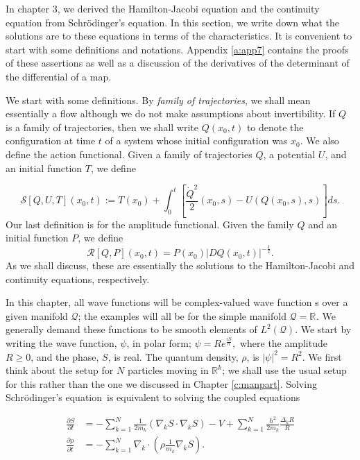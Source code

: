 \documentclass[11pt]{article}
\theoremstyle{remark}
\begin{document}
In chapter 3, we derived the Hamilton-Jacobi equation and the
continuity equation from Schr\"odinger's equation. In this section, we write down what the
solutions are to these equations in terms of the characteristics. 
It is convenient to start with some
definitions and notations. Appendix \ref{a:app7} contains the proofs
of these assertions as well as a discussion of the derivatives of the
determinant of the differential of a map. 

We start with some definitions. 
By \emph{family of trajectories}, we shall mean
essentially a flow although we do not make assumptions about
invertibility. If $Q$ is a family of trajectories, then we shall write
$Q(x_0, t)$  to denote the configuration at time $t$ of a system whose
initial configuration was $x_0$. We also define the action
functional. Given a family of trajectories $Q$, a potential $U$, and 
an initial function $T$, we define 


\[ 
\ensuremath{\mathcal{S}}[Q, U, T] (x_0, t) \ensuremath{:=}   T(x_0) + \int_0^t [
\frac{\dot{Q}^2}{2}(x_0, s) -
U(Q(x_0,s), s)] ds.
\]
Our last definition is for the amplitude functional. Given the family
$Q$ and an initial function $P$, we define 
\[
\ensuremath{\mathcal{R}}[Q, P](x_0, t) = P(x_0) |DQ(x_0,t) |^{-\frac{1}{2}}. 
\]
As we shall discuss, these are essentially the solutions to the
Hamilton-Jacobi and continuity equations, respectively. 

In this chapter, all wave functions will be complex-valued wave function
s over a given manifold \ensuremath{\mathcal{Q}}; the examples will all be for the
simple manifold 
$\ensuremath{\mathcal{Q}} = \ensuremath{\mathbb{R}^{}}$. 
We generally demand these functions to be smooth elements of
$L^2(\ensuremath{\mathcal{Q}})$. We start 
by writing the wave function, \ensuremath{\psi}, in polar form;   
$
\ensuremath{\psi} = Re^{\frac{iS}{\ensuremath{\hbar}}}, 
$
where the amplitude $R \geq 0$, and the phase, $S$, is real. The
quantum density, \ensuremath{\rho}, is $\ensuremath{|\ensuremath{\psi}|^2}  = R^2.$ 
We first think about the setup for $N$ particles moving in
$\ensuremath{\mathbb{R}^{k}}$; we shall use the usual setup for this rather than the one
we discussed in Chapter \ref{c:manpart}. 
Solving Schr\"odinger's equation\ is
equivalent to solving the coupled equations  


\begin{align*}
\ensuremath{\frac{\partial {S}}{\partial {t}}} &= -\sum_{k=1}^N \frac{1}{2m_k}(\nabla_k S \cdot \nabla_k
S) - {V} + \sum_{k=1}^N \frac{\ensuremath{\hbar}^2}{2m_k} \frac{\ensuremath{\Delta}_k R}{R} 
\\
\ensuremath{\frac{\partial {\ensuremath{\rho}}}{\partial {t}}} &= - \sum_{k=1}^N  \nabla_k \cdot (\ensuremath{\rho} \frac{1}{m_k}\nabla_k S)
.\\
\end{align*}
\end{document}
